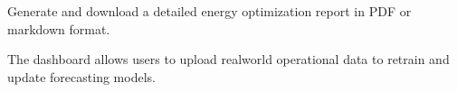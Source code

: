 \documentclass[letterpaper,10pt,english]{sphinxmanual}
\begin{document}

\begin{DUlineblock}{0em}
\item[] 
\end{DUlineblock}

\sphinxAtStartPar
{}

\sphinxAtStartPar
Generate and download a detailed energy optimization report in PDF or markdown format.


\begin{DUlineblock}{0em}
\item[] 
\end{DUlineblock}

\sphinxAtStartPar
{}

\sphinxAtStartPar
The dashboard allows users to upload real\sphinxhyphen{}world operational data to retrain and update forecasting models.




\renewcommand{\indexname}{Index}
\printindex
\end{document}
